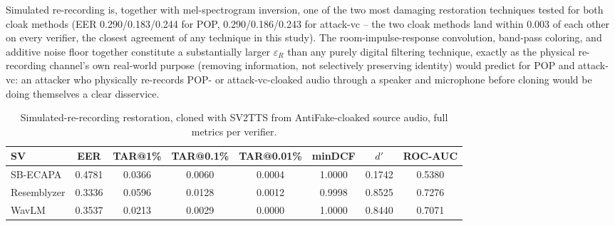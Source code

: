\documentclass[11pt]{article}
\begin{document}
Simulated re-recording is, together with mel-spectrogram inversion, one
of the two most damaging restoration techniques tested for both cloak
methods (EER 0.290/0.183/0.244 for POP, 0.290/0.186/0.243 for
attack-vc -- the two cloak methods land within 0.003 of each other on
every verifier, the closest agreement of any technique in this study).
The room-impulse-response convolution, band-pass coloring, and additive
noise floor together constitute a substantially larger $\varepsilon_R$
than any purely digital filtering technique, exactly as the physical
re-recording channel's own real-world purpose (removing information,
not selectively preserving identity) would predict for POP and
attack-vc: an attacker who physically re-records POP- or
attack-vc-cloaked audio through a speaker and microphone before cloning
would be doing themselves a clear disservice.

\begin{table}[H]
\centering
\caption{Simulated-re-recording restoration, cloned with SV2TTS from
AntiFake-cloaked source audio, full metrics per verifier.}
\label{tab:restoration-rerecording-antifake-results}
\begin{tabular}{lccccccc}
\toprule
SV & EER & TAR@1\% & TAR@0.1\% & TAR@0.01\% & minDCF & $d'$ & ROC-AUC \\
\midrule
SB-ECAPA    & 0.4781 & 0.0366 & 0.0060 & 0.0004 & 1.0000 & 0.1742 & 0.5380 \\
Resemblyzer & 0.3336 & 0.0596 & 0.0128 & 0.0012 & 0.9998 & 0.8525 & 0.7276 \\
WavLM       & 0.3537 & 0.0213 & 0.0029 & 0.0000 & 1.0000 & 0.8440 & 0.7071 \\
\bottomrule
\end{tabular}
\end{table}
\end{document}
